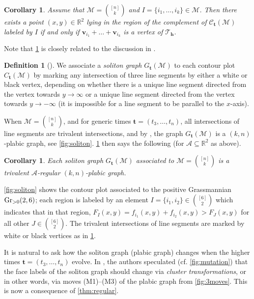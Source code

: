 \documentclass[11pt]{amsart}
\theoremstyle{plain}
\newtheorem{corollary}[theorem]{Corollary}
\theoremstyle{definition}
\newtheorem{definition}[theorem]{Definition}
\def\R{\mathbb{R}}
\def\v{{\bm{v}}}
\def\t{{\bm{t}}}
\def\A{\mathcal{A}}
\def\h{{\bm{h}}}
\def\Mcal{\mathcal{M}}
\def\Tcal{\mathcal{T}}
\def\Tiling{\Tcal}
\let\subset\subseteq
\begin{document}
\begin{corollary}\label{cor:plabicsoliton}
Assume that $\mathcal{M} = {[n] \choose k}$ and $I= \{i_1,\dots,i_k\}\in\Mcal$. Then there exists a point $(x,y)\in\R^2$ lying in the region of the complement of $\mathcal{C}_{\t}(\mathcal{M})$ labeled by $I$ if and only if $\v_{i_1} + \dots + \v_{i_k}$ is a vertex of $\Tiling_\h$.
\end{corollary}

Note that \cref{cor:plabicsoliton} is closely related to the discussion in 
\cite[Section 2.3]{KK}.


\begin{definition}[\cite{KW, KW2}]\label{def:solitongraph}
We associate a \emph{soliton graph} $G_{\t}(\mathcal{M})$
to each contour plot $C_{\t}(\mathcal{M})$
by marking any intersection of three line segments by either a white or black vertex,
depending on whether there is a unique line segment directed from the vertex
towards $y \to \infty$ or a unique line segment directed from the vertex 
towards $y \to -\infty$ (it is impossible for a line segment to be parallel
to the $x$-axis).  
\end{definition}

When $\mathcal{M} = {[n] \choose k}$, 
and for	generic times $\t = (t_3,\dots,t_n)$, all intersections of 
line segments are trivalent intersections, and 
by \cite[Corollary 10.9]{KW2},  
the graph $G_{\t}(\mathcal{M})$
is a $(k,n)$-plabic graph, 
see \cref{fig:soliton}.
\cref{cor:plabicsoliton} then says the following (for $\A\subset\R^2$ as above).
\begin{corollary}\label{cor2:plabicsoliton}
Each soliton graph 
$G_{\t}(\mathcal{M})$
associated to $\mathcal{M} = {[n] \choose k}$ is a trivalent  
$\mathcal{A}$-regular $(k,n)$-plabic graph.
\end{corollary}

\cref{fig:soliton} shows the contour plot associated to the positive Grassmannian
$\operatorname{Gr}_{>0}(2,6)$; each region is labeled by an element $I=\{i_1,i_2\} \in {[6] \choose 2}$
which indicates that in that region, $F_I(x,y) = f_{i_1}(x,y)+f_{i_2}(x,y) > F_J(x,y)$ 
for all other $J\in {[6] \choose 2}$.  The trivalent intersections of line
segments are marked by white or black vertices as in \cref{def:solitongraph}.

It is natural to ask how the soliton graph (plabic graph) changes when the higher times 
$\t = (t_3,\dots,t_n)$ evolve. In \cite{KW}, the authors speculated (cf. \cref{fig:mutation}) 
 that the face labels of the soliton graph should change via \emph{cluster transformations}, or in 
other words, via moves (M1)--(M3) of the plabic graph from \cref{fig:3moves}. This is now a consequence of \cref{thm:regular}.
\end{document}
